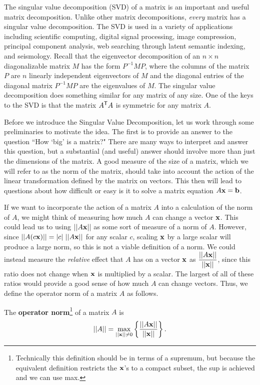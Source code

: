 The singular value decomposition (SVD) of a matrix is an important and useful matrix decomposition. Unlike other matrix decompositions, \emph{every} matrix has a singular value decomposition. The SVD is used in a variety of applications including scientific computing, digital signal processing, image compression, principal component analysis, web searching through latent semantic indexing, and seismology. 
Recall that the eigenvector decomposition of an $n \times n$ diagonalizable matrix $M$ has the form $P^{-1}MP$, where the columns of the matrix $P$ are $n$ linearly independent eigenvectors of $M$ and the diagonal entries of the diagonal matrix $P^{-1}MP$ are the eigenvalues of $M$. The singular value decomposition does something similar for any matrix of any size. One of the keys to the SVD is that the matrix $A^{\mathsf{T}}A$ is symmetric for any matrix $A$. 


\label{sec:mtx_op_norm}

Before we introduce the Singular Value Decomposition, let us work through some preliminaries to motivate the idea. The first is to provide an answer to the question ``How `big' is a matrix?" There are many ways to interpret and answer this question, but a substantial (and useful) answer should involve more than just the dimensions of the matrix. A good measure of the size of a matrix, which we will refer to as the norm of the matrix, should take into account the action of the linear transformation defined by the matrix on vectors. This then will lead to questions about how difficult or easy is it to solve a matrix equation $A \mathbf{x} = \mathbf{b}$.

If we want to incorporate the action of a matrix $A$ into a calculation of the norm of $A$, we might think of measuring how much $A$ can change a vector $\mathbf{x}$. This could lead us to using $||A\mathbf{x}||$ as some sort of measure of a norm of $A$. However, since $||A (c\vx)|| = |c| \ ||A\vx||$ for any scalar $c$, scaling $\mathbf{x}$ by a large scalar will produce a large norm, so this is not a viable definition of a norm. We could instead measure the \emph{relative} effect that $A$ has on a vector $\mathbf{x}$ as $\displaystyle \frac{||A\mathbf{x}||}{||\mathbf{x}||}$, since this ratio does not change when $\mathbf{x}$ is multiplied by a scalar. The largest of all of these ratios would provide a good sense of how much $A$ can change vectors. Thus, we define the operator norm of a matrix $A$ as follows.

\begin{definition} The \textbf{operator norm}\footnote{Technically this definition should be in terms of a supremum, but because the equivalent definition restricts the $\mathbf{x}$'s to a compact subset, the sup is achieved and we can use max.} of a matrix $A$ is  
\[||A|| = \max_{||\mathbf{x}|| \neq 0} \left\{\frac{||A\mathbf{x}||}{||\mathbf{x}||} \right\}.\]
\end{definition}

